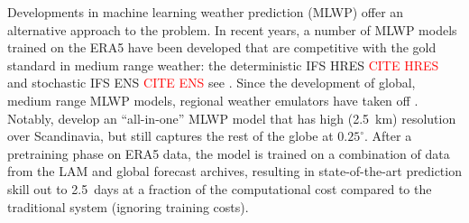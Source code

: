 \documentclass[11pt]{article}
\newcommand{\red}[1]{\textcolor{red}{#1}}
\begin{document}
Developments in machine learning weather prediction (MLWP)
offer an alternative approach to the problem.
In recent years, a number of MLWP models trained on the
ERA5 \citep{hersbach_era5_2020}
have been developed that are competitive with the gold
standard in medium range weather:
the deterministic IFS HRES \red{CITE HRES} and stochastic IFS ENS
\red{CITE ENS} see
\citep{bi_accurate_2023,lam_learning_2023,chen_fuxi_2023,chen_operational_2025,bodnar_foundation_2025,lang_aifs_2024,sadeghi_tabas_gfs-powered_2025}.
Since the development of global, medium range MLWP models, regional weather
emulators have taken off
\citep[e.g.,][]{adamov_building_2025,flora_wofscast_2025,abdi_hrrrcast_2026}.
Notably, \citet{nipen_regional_2026} develop an ``all-in-one'' MLWP model
that has high (2.5~km) resolution over Scandinavia, but still captures the rest
of the globe at $0.25^\circ$.
After a pretraining phase on ERA5 data,
the model is trained on a combination of data from the LAM and global forecast
archives, resulting in state-of-the-art prediction skill out to 2.5~days
at a fraction of the computational cost compared to the traditional system
(ignoring training costs).
\end{document}
